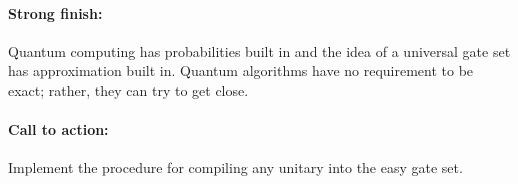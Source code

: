 \documentclass[11pt]{article}
\begin{document}
\paragraph{Strong finish:}
Quantum computing has probabilities built in and
the idea of a universal gate set has approximation built in.
Quantum algorithms have no requirement to be exact; 
rather, they can try to get close.

\paragraph{Call to action:}
Implement the procedure for compiling any unitary into the easy gate set.
\end{document}

